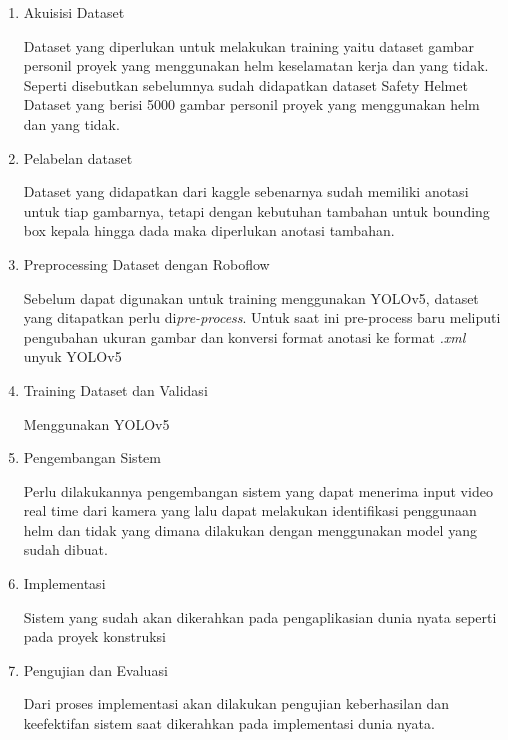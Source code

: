 \begin{enumerate}
  \item Akuisisi Dataset
  \par Dataset yang diperlukan untuk melakukan training yaitu dataset gambar personil proyek yang menggunakan helm keselamatan kerja dan yang tidak. Seperti disebutkan sebelumnya sudah didapatkan dataset Safety Helmet Dataset yang berisi 5000 gambar personil proyek yang menggunakan helm dan yang tidak.
  
  \item Pelabelan dataset
  \par Dataset yang didapatkan dari kaggle sebenarnya sudah memiliki anotasi untuk tiap gambarnya, tetapi dengan kebutuhan tambahan untuk bounding box kepala hingga dada maka diperlukan anotasi tambahan.
  
  \item Preprocessing Dataset dengan Roboflow
  \par Sebelum dapat digunakan untuk training menggunakan YOLOv5, dataset yang ditapatkan perlu di\emph{pre-process}. Untuk saat ini pre-process baru meliputi pengubahan ukuran gambar dan konversi format anotasi ke format \emph{.xml} unyuk YOLOv5

  \item Training Dataset dan Validasi
  \par Menggunakan YOLOv5

  \item Pengembangan Sistem
  \par Perlu dilakukannya pengembangan sistem yang dapat menerima input video real time dari kamera yang lalu dapat melakukan identifikasi penggunaan helm dan tidak yang dimana dilakukan dengan menggunakan model yang sudah dibuat. 

  \item Implementasi
  \par Sistem yang sudah akan dikerahkan pada pengaplikasian dunia nyata seperti pada proyek konstruksi

  \item Pengujian dan Evaluasi
  \par Dari proses implementasi akan dilakukan pengujian keberhasilan dan keefektifan sistem saat dikerahkan pada implementasi dunia nyata.

\end{enumerate}





% 

